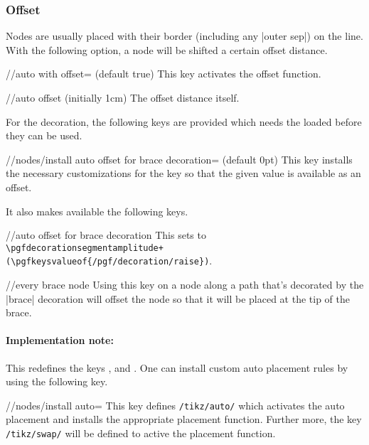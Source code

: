 \begin{multicols}{2}
\subsubsection{Offset}
Nodes are usually placed with their border (including any |outer sep|)
on the line.
With the following option, a node will be shifted a certain offset distance.

\begin{key}{/\tikzext/auto with offset= (default true)}
  This key activates the offset function.
\end{key}
\begin{key}{/\tikzext/auto offset (initially 1cm)}
The offset distance itself.
\end{key}

For the  decoration,
the following keys are provided which needs the
 loaded before they
can be used.
\begin{key}{/\tikzext/nodes/install auto offset for brace decoration= (default 0pt)}
This key installs the necessary customizations
for the  key
so that the given value is available as an offset.

It also makes available the following keys.
\begin{key}{/\tikzext/auto offset for brace decoration}
This sets  to
\texttt{\textbackslash pgfdecorationsegmentamplitude+
  (\textbackslash pgfkeysvalueof\{/pgf/decoration/raise\})}.
\end{key}
\begin{stylekey}{/\tikzext/every brace node}
Using this key on a node along a path that's decorated by the |brace| decoration
will offset the node so that it will be placed at the tip of the brace.
\end{stylekey}
\end{key}

\paragraph{Implementation note:}
This redefines the keys ,
 and .
One can install custom auto placement rules by using the following key.
\begin{key}{/\tikzext/nodes/install auto=}
  This key defines \texttt{/tikz/auto/} which activates the auto placement
  and installs the appropriate placement function.
  Further more, the key \texttt{/tikz/swap/} will be defined
  to active the  placement function.
  

\end{key}
\end{multicols}
